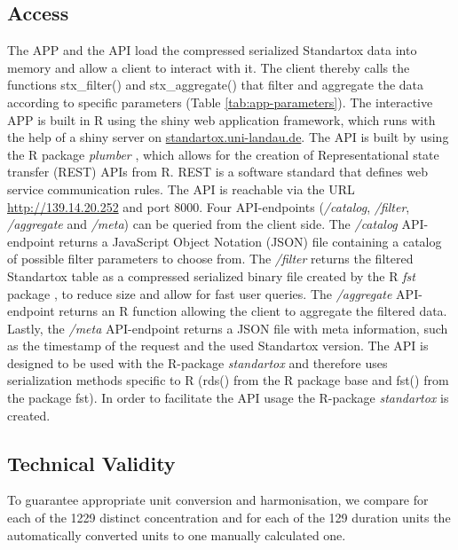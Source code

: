 \subsection{Access}
The APP and the API load the compressed serialized Standartox data into memory and allow a client to interact with it. The client thereby calls the functions stx\_filter() and stx\_aggregate() that filter and aggregate the data according to specific parameters (Table \ref{tab:app-parameters}). The interactive APP is built in R using the shiny web application framework, which runs with the help of a shiny server \citep{chang_shiny_2018} on \url{standartox.uni-landau.de}. The API is built by using the R package \textit{plumber} \citep{trestletechnologyllc_plumber_2018}, which allows for the creation of Representational state transfer (REST) APIs from R. REST is a software standard that defines web service communication rules. The API is reachable via the URL \url{http://139.14.20.252} and port 8000. Four API-endpoints (\textit{/catalog}, \textit{/filter}, \textit{/aggregate} and \textit{/meta}) can be queried from the client side. The \textit{/catalog} API-endpoint returns a JavaScript Object Notation (JSON) file containing a catalog of possible filter parameters to choose from. The \textit{/filter} returns the filtered Standartox table as a compressed serialized binary file created by the R \textit{fst} package \citep{klik_fst_2019}, to reduce size and allow for fast user queries. The \textit{/aggregate} API-endpoint returns an R function allowing the client to aggregate the filtered data. Lastly, the \textit{/meta} API-endpoint returns a JSON file with meta information, such as the timestamp of the request and the used Standartox version. The API is designed to be used with the R-package \textit{standartox} and therefore uses serialization methods specific to R (rds() from the R package base and fst() from the package fst). In order to facilitate the API usage the R-package \textit{standartox} is created.

\subsection{Technical Validity}
To guarantee appropriate unit conversion and harmonisation, we compare for each of the 1229 distinct concentration and for each of the 129 duration units the automatically converted units to one manually calculated one.


